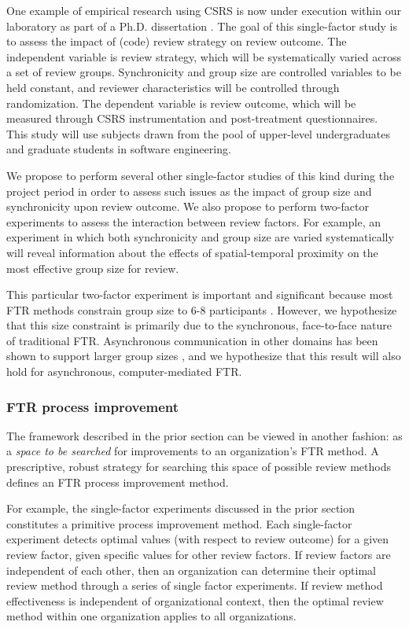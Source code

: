 One example of empirical research using CSRS is now under execution within
our laboratory as part of a Ph.D. dissertation \cite{csdl-ro-93-05}.  The
goal of this single-factor study is to assess the impact of (code) review
strategy on review outcome.  The independent variable is review strategy,
which will be systematically varied across a set of review groups.
Synchronicity and group size are controlled variables to be held constant,
and reviewer characteristics will be controlled through randomization. The
dependent variable is review outcome, which will be measured through CSRS
instrumentation and post-treatment questionnaires.  This study will use
subjects drawn from the pool of upper-level undergraduates and graduate
students in software engineering.

We propose to perform several other single-factor studies of this kind
during the project period in order to assess such issues as the impact of
group size and synchronicity upon review outcome.  We also propose to
perform two-factor experiments to assess the interaction between review
factors.  For example, an experiment in which both synchronicity and group
size are varied systematically will reveal information about the effects of
spatial-temporal proximity on the most effective group size for review.

This particular two-factor experiment is important and significant because
most FTR methods constrain group size to 6-8 participants
\cite{Freedman90,Fagan76}.  However, we hypothesize that this size
constraint is primarily due to the synchronous, face-to-face nature of
traditional FTR.  Asynchronous communication in other domains has been
shown to support larger group sizes \cite{Nunamaker91}, and we hypothesize
that this result will also hold for asynchronous, computer-mediated FTR.

\subsubsection{FTR process improvement}

The framework described in the prior section can be viewed in another
fashion: as a {\em space to be searched} for improvements to an
organization's FTR method. A prescriptive, robust strategy for searching
this space of possible review methods defines an FTR process improvement
method.

For example, the single-factor experiments discussed in the prior section
constitutes a primitive process improvement method.  Each single-factor
experiment detects optimal values (with respect to review outcome) for a
given review factor, given specific values for other review factors.  If
review factors are independent of each other, then an organization can
determine their optimal review method through a series of single factor
experiments.  If review method effectiveness is independent of
organizational context, then the optimal review method within one
organization applies to all organizations.

